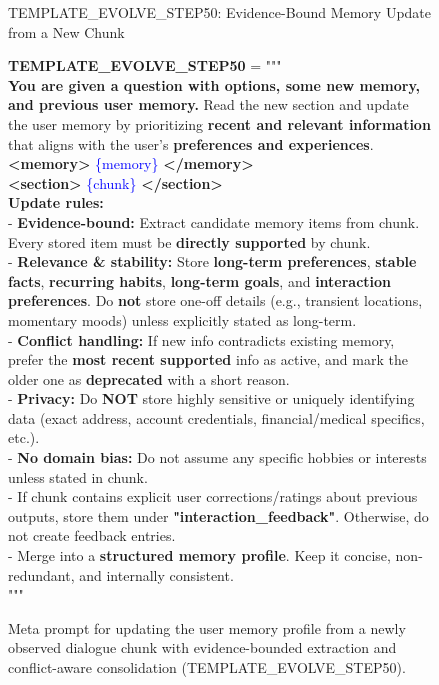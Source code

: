 \begin{figure}[!ht]
\begin{AIboxPurpleFrame}{TEMPLATE\_EVOLVE\_STEP50: Evidence-Bound Memory Update from a New Chunk}
\vspace{1mm}
{\footnotesize
\setlength{\parindent}{0pt}
\setlength{\parskip}{2pt}

\textbf{TEMPLATE\_EVOLVE\_STEP50} = """ \\

\textbf{You are given a question with options, some new memory, and previous user memory.} Read the new section and update the user memory by prioritizing \textbf{recent and relevant information} that aligns with the user's \textbf{preferences and experiences}. \\

\textbf{<memory>} \textcolor{blue}{\{memory\}} \textbf{</memory>} \\

\textbf{<section>} \textcolor{blue}{\{chunk\}} \textbf{</section>} \\

\textbf{Update rules:} \\
- \textbf{Evidence-bound:} Extract candidate memory items from chunk. Every stored item must be \textbf{directly supported} by chunk. \\
- \textbf{Relevance \& stability:} Store \textbf{long-term preferences}, \textbf{stable facts}, \textbf{recurring habits}, \textbf{long-term goals}, and \textbf{interaction preferences}. Do \textbf{not} store one-off details (e.g., transient locations, momentary moods) unless explicitly stated as long-term. \\
- \textbf{Conflict handling:} If new info contradicts existing memory, prefer the \textbf{most recent supported} info as active, and mark the older one as \textbf{deprecated} with a short reason. \\
- \textbf{Privacy:} Do \textbf{NOT} store highly sensitive or uniquely identifying data (exact address, account credentials, financial/medical specifics, etc.). \\
- \textbf{No domain bias:} Do not assume any specific hobbies or interests unless stated in chunk. \\
- If chunk contains explicit user corrections/ratings about previous outputs, store them under \textbf{"interaction\_feedback"}. Otherwise, do not create feedback entries. \\
- Merge into a \textbf{structured memory profile}. Keep it concise, non-redundant, and internally consistent. \\

"""
}
\end{AIboxPurpleFrame}
\vspace{-1em}
\caption{Meta prompt for updating the user memory profile from a newly observed dialogue chunk with evidence-bounded extraction and conflict-aware consolidation (TEMPLATE\_EVOLVE\_STEP50).}
\label{prompt:template_evolve_step50}
\end{figure}


